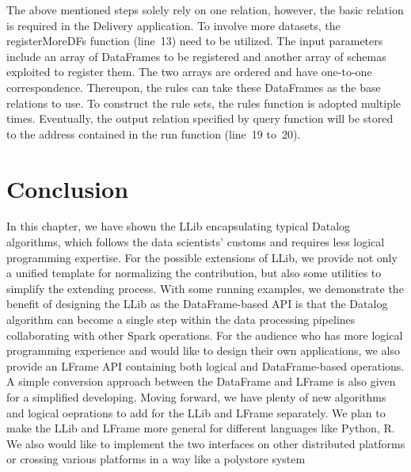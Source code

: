 The above mentioned steps solely rely on one relation, however, the basic relation is required in the Delivery application. To involve more datasets, the registerMoreDFs function (line~13) need to be utilized. The input parameters include an array of DataFrames to be registered and another array of schemas exploited to register them. The two arrays are ordered and have one-to-one correspondence. Thereupon, the rules can take these DataFrames as the base relations to use. To construct the rule sets, the rules function is adopted multiple times. Eventually, the output relation specified by query function will be stored to the address contained in the run function (line~19 to~20). 





\section{Conclusion}
\label{llib:conclusion}

In this chapter, we have shown the LLib encapsulating typical Datalog algorithms, which follows the data scientists' customs  and requires less logical programming expertise.  For the possible  extensions of LLib, we provide not only a unified template for normalizing the contribution, but also some utilities to simplify the extending process.  With some running examples, we  demonstrate the benefit of designing the LLib as the DataFrame-based API is that the Datalog algorithm can  become a single step within the data processing pipelines collaborating with other Spark operations. For the audience who has more logical programming experience and would like to design their own applications, we also provide an LFrame API containing both logical and DataFrame-based operations. A simple conversion approach between the DataFrame and LFrame is also given for a simplified developing. Moving forward, we have  plenty of new algorithms and logical oeprations to add for the LLib and LFrame separately. We plan to make the LLib and LFrame more general for different languages like Python, R. We also  would like to implement the two interfaces on other distributed platforms or crossing various platforms in a way like a polystore system \citep{duggan2015bigdawg}

